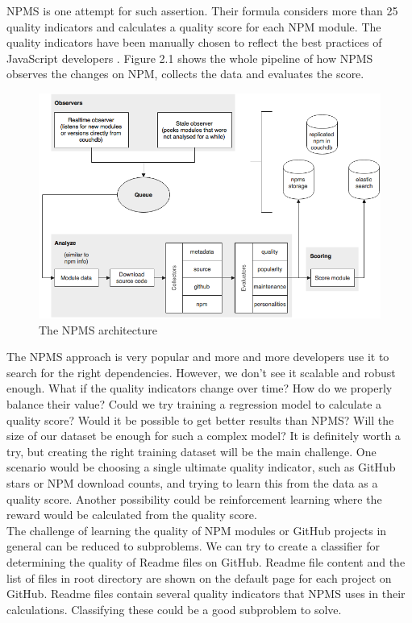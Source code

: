 \documentclass[thesis=M,english]{FITthesis}[2012/10/20]
\begin{document}
NPMS is one attempt for such assertion. Their formula considers more than 25 quality indicators and calculates a quality score for each NPM module. The quality indicators have been manually chosen to reflect the best practices of JavaScript developers \cite{npms_arch}. Figure 2.1 shows the whole pipeline of how NPMS observes the changes on NPM, collects the data and evaluates the score. \\

\begin{center}
\begin{figure}[h!]
	\includegraphics[totalheight=225pt]{images/npms_analysis.png}
	\caption{The NPMS architecture}
	\label{fig: npms_analysis}
\end{figure}
\end{center}


The NPMS approach is very popular and more and more developers use it to search for the right dependencies. However, we don't see it scalable and robust enough. What if the quality indicators change over time? How do we properly balance their value? Could we try training a regression model to calculate a quality score? Would it be possible to get better results than NPMS? Will the size of our dataset be enough for such a complex model? It is definitely worth a try, but creating the right training dataset will be the main challenge. One scenario would be choosing a single ultimate quality indicator, such as GitHub stars or NPM download counts, and trying to learn this from the data as a quality score. Another possibility could be reinforcement learning where the reward would be  calculated from the quality score. \\

The challenge of learning the quality of NPM modules or GitHub projects in general can be reduced to subproblems. We can try to create a classifier for determining the quality of Readme files on GitHub. Readme file content and the list of files in root directory are shown on the default page for each project on GitHub. Readme files contain several quality indicators that NPMS uses in their calculations. Classifying these could be a good subproblem to solve.
\end{document}
